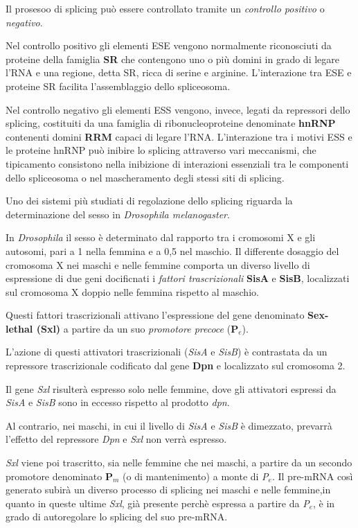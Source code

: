 \documentclass[]{article}
\begin{document}
Il prosesoo di splicing può essere controllato tramite un
\emph{controllo positivo} o \emph{negativo}.

Nel controllo positivo gli elementi ESE vengono normalmente riconosciuti
da proteine della famiglia \textbf{SR} che contengono uno o più domini
in grado di legare l'RNA e una regione, detta SR, ricca di serine e
arginine. L'interazione tra ESE e proteine SR facilita l'assemblaggio
dello spliceosoma.

Nel controllo negativo gli elementi ESS vengono, invece, legati da
repressori dello splicing, costituiti da una famiglia di
ribonucleoproteine denominate \textbf{hnRNP} contenenti domini
\textbf{RRM} capaci di legare l'RNA. L'interazione tra i motivi ESS e le
proteine hnRNP può inibire lo splicing attraverso vari meccanismi, che
tipicamento consistono nella inibizione di interazioni essenziali tra le
componenti dello spliceosoma o nel mascheramento degli stessi siti di
splicing.

Uno dei sistemi più studiati di regolazione dello splicing riguarda la
determinazione del sesso in \emph{Drosophila melanogaster}.

In \emph{Drosophila} il sesso è determinato dal rapporto tra i cromosomi
X e gli autosomi, pari a 1 nella femmina e a 0,5 nel maschio. Il
differente dosaggio del cromosoma X nei maschi e nelle femmine comporta
un diverso livello di espressione di due geni docificnati i
\emph{fattori trascrizionali} \textbf{SisA} e \textbf{SisB}, localizzati
sul cromosoma X doppio nelle femmina rispetto al maschio.

Questi fattori trascrizionali attivano l'espressione del gene denominato
\textbf{Sex-lethal (Sxl)} a partire da un suo \emph{promotore precoce}
(\textbf{P\(_e\)}).

L'azione di questi attivatori trascrizionali (\emph{SisA} e \emph{SisB})
è contrastata da un repressore trascrizionale codificato dal gene
\textbf{Dpn} e localizzato sul cromosoma 2.

Il gene \emph{Sxl} risulterà espresso solo nelle femmine, dove gli
attivatori espressi da \emph{SisA} e \emph{SisB} sono in eccesso
rispetto al prodotto \emph{dpn}.

Al contrario, nei maschi, in cui il livello di \emph{SisA} e \emph{SisB}
è dimezzato, prevarrà l'effetto del repressore \emph{Dpn} e \emph{Sxl}
non verrà espresso.

\emph{Sxl} viene poi trascritto, sia nelle femmine che nei maschi, a
partire da un secondo promotore denominato \textbf{P\(_m\)} (o di
mantenimento) a monte di \emph{P\(_e\)}. Il pre-mRNA così generato
subirà un diverso processo di splicing nei maschi e nelle femmine,in
quanto in queste ultime \emph{Sxl}, già presente perchè espressa a
partire da \emph{P\(_e\)}, è in grado di autoregolare lo splicing del
suo pre-mRNA.
\end{document}
